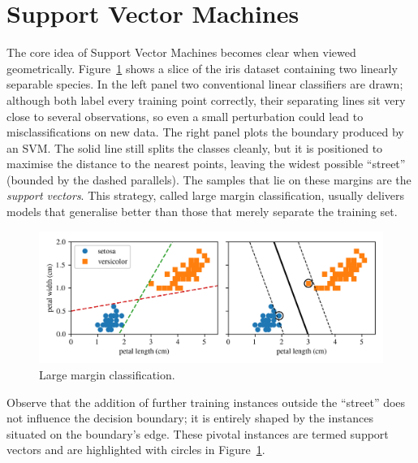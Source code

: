 \documentclass[12pt,letter]{article}
\begin{document}
	


	\setcounter{section}{5}	
	\setcounter{figure}{0}   
	\renewcommand\thefigure{\thesection.\arabic{figure}}
	\setcounter{equation}{0}   
	\renewcommand\theequation{\thesection.\arabic{equation}}


	\section{Support Vector Machines}








The core idea of Support Vector Machines becomes clear when viewed geometrically. Figure~\ref{fig:SVM_large_margin_classification} shows a slice of the iris dataset containing two linearly separable species. In the left panel two conventional linear classifiers are drawn; although both label every training point correctly, their separating lines sit very close to several observations, so even a small perturbation could lead to misclassifications on new data. The right panel plots the boundary produced by an SVM. The solid line still splits the classes cleanly, but it is positioned to maximise the distance to the nearest points, leaving the widest possible ``street'' (bounded by the dashed parallels). The samples that lie on these margins are the \emph{support vectors}. This strategy, called large margin classification, usually delivers models that generalise better than those that merely separate the training set.



\begin{figure}[H]
	\centering
	\includegraphics[width=6.5in]{../figures/SVM_large_margin_classification}
	\caption{Large margin classification.}
	\label{fig:SVM_large_margin_classification}
\end{figure}

Observe that the addition of further training instances outside the ``street'' does not influence the decision boundary; it is entirely shaped by the instances situated on the boundary's edge. These pivotal instances are termed support vectors and are highlighted with circles in Figure~\ref{fig:SVM_large_margin_classification}.
\end{document}
